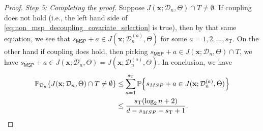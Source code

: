 \documentclass[10pt,a4paper]{amsart}
\DeclarePairedDelimiter{\braces}{\lbrace}{\rbrace}
\newcommand{\MSP}{\textsf{MSP}}
\newcommand{\bx}{\mathbf{x}}
\newcommand{\data}[1][n]{\mathcal{D}_{#1}}
\newcommand{\nfeats}{d}
\newcommand{\nsamples}{n}
\newcommand{\sparsity}{s}
\newcommand{\traversalsize}{\sparsity_{\operatorname{T}}}
\newcommand{\traversal}{T}
\renewcommand{\P}{\mathbb{P}}
\begin{document}
\begin{proof}
    \textit{Step 5: Completing the proof.}
    Suppose $J(\bx;\data,\Theta)\cap \traversal \neq \emptyset$.
    If coupling does not hold (i.e., the left hand side of \eqref{eq:non_msp_decoupling_covariate_selection} is true), then by that same equation, we see that $\sparsity_{\MSP} + a \in J(\bx;\data^{(a)},\Theta)$ for some $a=1,2,\ldots,\traversalsize$.
    On the other hand if coupling does hold, then picking $\sparsity_{\MSP} + a \in J(\bx;\data,\Theta)\cap \traversal$, we have $\sparsity_{\MSP} + a \in J(\bx;\data,\Theta) = J(\bx;\data^{(a)},\Theta)$.
    In conclusion, we have
    \begin{equation}
    \begin{split}
        \P_{\data}\braces*{J(\bx;\data,\Theta)\cap \traversal \neq \emptyset } & \leq \sum_{a=1}^{\traversalsize} \P\braces*{\sparsity_{\MSP} + a \in J(\bx;\data^{(a)},\Theta)} \\
        & \leq \frac{\traversalsize(\log_2 \nsamples + 2)}{\nfeats - \sparsity_{\MSP}-\traversalsize+1}. \qedhere
    \end{split}
    \end{equation}
\end{proof}
\end{document}
